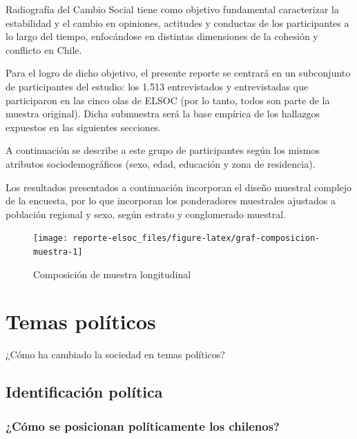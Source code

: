 \documentclass[
  12pt,
]{book}
\begin{document}
Radiografía del Cambio Social tiene como objetivo fundamental caracterizar la estabilidad y el cambio en opiniones, actitudes y conductas de los participantes a lo largo del tiempo, enfocándose en distintas dimensiones de la cohesión y conflicto en Chile.

Para el logro de dicho objetivo, el presente reporte se centrará en un subconjunto de participantes del estudio: los 1.513 entrevistados y entrevistadas que participaron en las cinco olas de ELSOC (por lo tanto, todos son parte de la muestra original). Dicha submuestra será la base empírica de los hallazgos expuestos en las siguientes secciones.

A continuación se describe a este grupo de participantes según los mismos atributos sociodemográficos (sexo, edad, educación y zona de residencia).

Los resultados presentados a continuación incorporan el diseño muestral complejo de la encuesta, por lo que incorporan los ponderadores muestrales ajustados a población regional y sexo, según estrato y conglomerado muestral.

\begin{figure}

{\centering \texttt{[image: reporte-elsoc\_files/figure-latex/graf-composicion-muestra-1]} 

}

\caption{Composición de muestra longitudinal}\label{fig:graf-composicion-muestra}
\end{figure}

\hypertarget{temas-poluxedticos}{%
\chapter{Temas políticos}\label{temas-poluxedticos}}

¿Cómo ha cambiado la sociedad en temas políticos?

\hypertarget{identificaciuxf3n-poluxedtica}{%
\section{Identificación política}\label{identificaciuxf3n-poluxedtica}}

\hypertarget{cuxf3mo-se-posicionan-poluxedticamente-los-chilenos}{%
\subsection{¿Cómo se posicionan políticamente los chilenos?}\label{cuxf3mo-se-posicionan-poluxedticamente-los-chilenos}}
\end{document}
